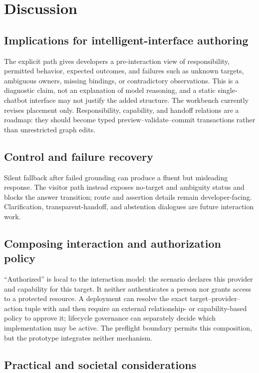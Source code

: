 \section{Discussion}

\subsection{Implications for intelligent-interface authoring}

The explicit path gives developers a pre-interaction view of responsibility,
permitted behavior, expected outcomes, and failures such as unknown targets,
ambiguous owners, missing bindings, or contradictory observations. This is a
diagnostic claim, not an explanation of model reasoning, and a static
single-chatbot interface may not justify the added structure. The workbench
currently revises placement only. Responsibility, capability, and handoff
relations are a roadmap: they should become typed preview--validate--commit
transactions rather than unrestricted graph edits.

\subsection{Control and failure recovery}

Silent fallback after failed grounding can produce a fluent but misleading
response. The visitor path instead exposes no-target and ambiguity status and
blocks the answer transition; route and assertion details remain
developer-facing. Clarification, transparent-handoff, and abstention dialogues
are future interaction work.

\subsection{Composing interaction and authorization policy}

``Authorized'' is local to the interaction model: the scenario declares this
provider and capability for this target. It neither authenticates a person nor
grants access to a protected resource. A deployment can resolve the exact
target--provider--action tuple with \systemname{} and then require an external
relationship- or capability-based policy to approve it; lifecycle governance
can separately decide which implementation may be active. The preflight
boundary permits this composition, but the prototype integrates neither
mechanism.

\subsection{Practical and societal considerations}

